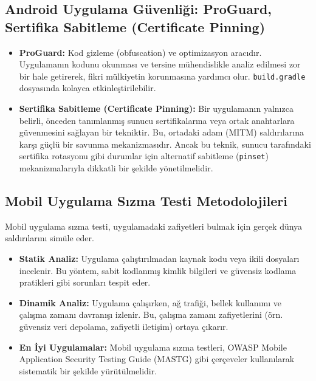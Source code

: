 \subsection{Android Uygulama Güvenliği: ProGuard, Sertifika Sabitleme (Certificate Pinning)}
\begin{itemize}
\item \textbf{ProGuard:} Kod gizleme (obfuscation) ve optimizasyon aracıdır. Uygulamanın kodunu okunması ve tersine mühendislikle analiz edilmesi zor bir hale getirerek, fikri mülkiyetin korunmasına yardımcı olur. \texttt{build.gradle} dosyasında kolayca etkinleştirilebilir.
\item \textbf{Sertifika Sabitleme (Certificate Pinning):} Bir uygulamanın yalnızca belirli, önceden tanımlanmış sunucu sertifikalarına veya ortak anahtarlara güvenmesini sağlayan bir tekniktir. Bu, ortadaki adam (MITM) saldırılarına karşı güçlü bir savunma mekanizmasıdır. Ancak bu teknik, sunucu tarafındaki sertifika rotasyonu gibi durumlar için alternatif sabitleme (\texttt{pinset}) mekanizmalarıyla dikkatli bir şekilde yönetilmelidir.
\end{itemize}

\subsection{Mobil Uygulama Sızma Testi Metodolojileri}

Mobil uygulama sızma testi, uygulamadaki zafiyetleri bulmak için gerçek dünya saldırılarını simüle eder.

\begin{itemize}
\item \textbf{Statik Analiz:} Uygulama çalıştırılmadan kaynak kodu veya ikili dosyaları incelenir. Bu yöntem, sabit kodlanmış kimlik bilgileri ve güvensiz kodlama pratikleri gibi sorunları tespit eder.
\item \textbf{Dinamik Analiz:} Uygulama çalışırken, ağ trafiği, bellek kullanımı ve çalışma zamanı davranışı izlenir. Bu, çalışma zamanı zafiyetlerini (örn. güvensiz veri depolama, zafiyetli iletişim) ortaya çıkarır.
\item \textbf{En İyi Uygulamalar:} Mobil uygulama sızma testleri, OWASP Mobile Application Security Testing Guide (MASTG) gibi çerçeveler kullanılarak sistematik bir şekilde yürütülmelidir.
\end{itemize}
